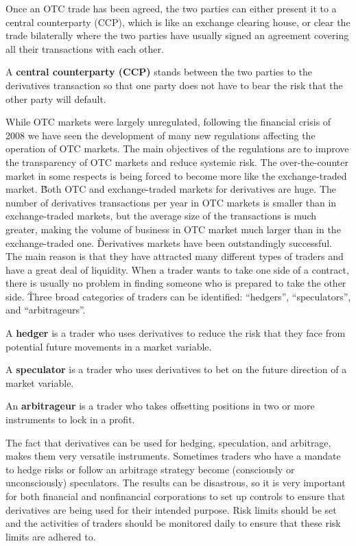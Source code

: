Once an OTC trade has been agreed, the two parties can either present it to a central counterparty (CCP), which is like
an exchange clearing house, or clear the trade bilaterally where the two parties have usually signed an agreement
covering all their transactions with each other.

A \textbf{central counterparty (CCP)} stands between the two parties to the derivatives transaction so that one party
does not have to bear the risk that the other party will default.
\ed

While OTC markets were largely unregulated, following the financial crisis of 2008 we have seen the development of
many new regulations affecting the operation of OTC markets. The main objectives of the regulations are to improve
the transparency of OTC markets and reduce systemic risk. The over-the-counter market in some respects is being forced
to become more like the exchange-traded market. \v

Both OTC and exchange-traded markets for derivatives are huge. The number of derivatives transactions per year in OTC
markets is smaller than in exchange-traded markets, but the average size of the transactions is much greater, making the
volume of business in OTC market much larger than in the exchange-traded one. \v

Derivatives markets have been outstandingly successful. The main reason is that they have attracted many different 
types of traders and have a great deal of liquidity. When a trader wants to take one side of a contract, 
there is usually no problem in finding someone who is prepared to take the other side. \v

Three broad categories of traders can be identified: ``hedgers'', ``speculators'', and ``arbitrageurs''. 

\bd[Hedger]
A \textbf{hedger} is a trader who uses derivatives to reduce the risk that they face from potential future movements in
a market variable.
\ed

\bd[Speculator]
A \textbf{speculator} is a trader who uses derivatives to bet on the future direction of a market variable.
\ed

\bd[Arbitrageur]
An \textbf{arbitrageur} is a trader who takes offsetting positions in two or more instruments to lock in a profit.
\ed

The fact that derivatives can be used for hedging, speculation, and arbitrage, makes them very versatile instruments.
Sometimes traders who have a mandate to hedge risks or follow an arbitrage strategy become (consciously or
unconsciously) speculators. The results can be disastrous, so it is very important for both financial and
nonfinancial corporations to set up controls to ensure that derivatives are being used for their intended purpose.
Risk limits should be set and the activities of traders should be monitored daily to ensure that these risk limits
are adhered to.

